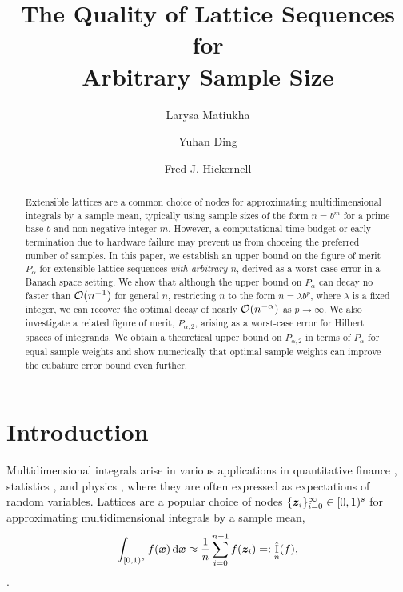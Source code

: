\documentclass[authoryear]{elsarticle}
\newcommand{\appxintn}{\appxint_n}
\DeclareMathOperator{\appxint}{\hat{I}}
\begin{document}
\title{The Quality of Lattice Sequences for \\ Arbitrary Sample Size}
\author[inst1]{Larysa Matiukha}
\author[inst1]{Yuhan Ding}
\author[inst1]{Fred J. Hickernell}
\begin{abstract} Extensible lattices are a common choice of 
nodes for approximating multidimensional integrals by a sample mean, typically using sample sizes of the form $n = b^m$ for a prime base $b$ and non-negative integer $m$. However, a computational time budget or early termination due to hardware failure may prevent us from choosing the preferred number of samples. In this paper, we establish an upper bound on the figure of merit $P_\alpha$ for extensible lattice sequences \emph{with arbitrary $n$}, derived as a worst-case error in a Banach space setting. 
We show that although the upper bound on $P_\alpha$ can decay no faster than $\operatorname{{\mathcal O}}(n^{-1})$ for general $n$, restricting $n$ to the form $n =\lambda b^p$, where $\lambda$ is a fixed integer, we can recover the optimal decay of nearly $\operatorname{{\mathcal O}}(n^{-\alpha})$ as $p \to \infty$. We also investigate a related figure of merit, $P_{\alpha,2}$, arising as a worst-case error for Hilbert spaces of integrands. We obtain a theoretical upper bound on $P_{\alpha,2}$ in terms of $P_{\alpha}$ for equal sample weights and show numerically that optimal sample weights can improve the cubature error bound even further.


\end{abstract}

\maketitle

\section{Introduction}
Multidimensional integrals arise in various applications in quantitative finance \citep{CafMorOwe97}, statistics \citep{Gen92,GenBre99}, and physics \citep{Kei96,PapTra97}, where they are often expressed as expectations of random variables.
Lattices are a popular choice of nodes $\{\boldsymbol{z}_i\}_{i=0}^{\infty} \in [0,1)^s$ for approximating multidimensional integrals by a sample mean,
\[
\int_{[0,1)^s} f(\vx) \, \dif \vx \approx \frac{1}{n} \sum_{i=0}^{n-1} f(\vz_i) =:\appxintn(f),
\]
\citep{DicEtal22a,Nie92,SloJoe94}.
\end{document}
